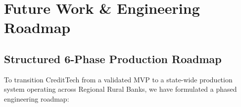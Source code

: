 \chapter{Future Work \& Engineering Roadmap}
\label{chap:future_work}

\section{Structured 6-Phase Production Roadmap}
To transition CreditTech from a validated MVP to a state-wide production system operating across Regional Rural Banks, we have formulated a phased engineering roadmap:

